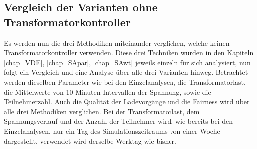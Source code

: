 \subsection{Vergleich der Varianten ohne Transformatorkontroller}
Es werden nun die drei Methodiken miteinander verglichen, welche keinen Transformatorkontroller verwenden. Diese drei Techniken wurden in den Kapiteln \ref{chap_VDE}, \ref{chap_SApar}, \ref{chap_SAwt} jeweils einzeln für sich analysiert, nun folgt ein Vergleich und eine Analyse über alle drei Varianten hinweg. Betrachtet werden dieselben Parameter wie bei den Einzelanalysen, die Transformatorlast, die Mittelwerte von 10 Minuten Intervallen der Spannung, sowie die Teilnehmerzahl. Auch die Qualität der Ladevorgänge und die Fairness wird über alle drei Methodiken verglichen.
Bei der Transformatorlast, dem Spannungsverlauf und der Anzahl der Teilnehmer wird, wie bereits bei den Einzelanalysen, nur ein Tag des Simulationszeitraums von einer Woche dargestellt, verwendet wird derselbe Werktag wie bisher.
